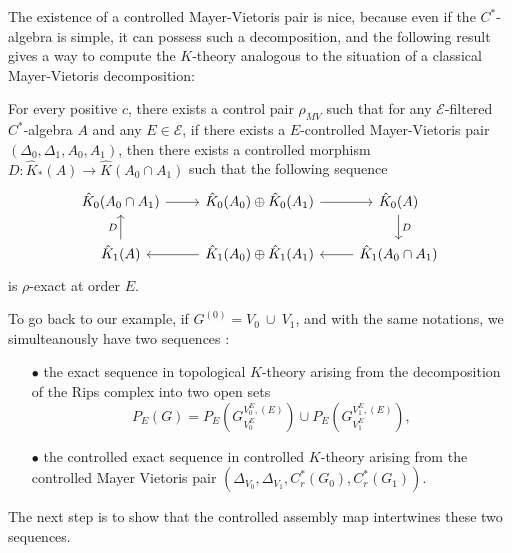 


The existence of a controlled Mayer-Vietoris pair is nice, because even if the $C^*$-algebra is simple, it can possess such a decomposition, and the following result gives a way to compute the $K$-theory analogous to the situation of a classical Mayer-Vietoris decomposition:

\begin{thm}
For every positive $c$, there exists a control pair $\rho_{MV}$ such that for any $\mathcal E$-filtered $C^*$-algebra $A$ and any $E\in\mathcal E$, if there exists a $E$-controlled Mayer-Vietoris pair $(\Delta_0,\Delta_1,A_0,A_1)$, then there exists a controlled morphism $D : \hat K_*(A)\rightarrow \hat K(A_0\cap A_1)$ such that the following sequence 
\[\begin{tikzcd}
\hat K_0(A_0\cap A_1 ) \arrow{r}& \hat K_0(A_0)\arrow{r}\oplus \hat K_0(A_1) & \hat K_0(A)\arrow{d}{D} \\
\arrow{u}{D}\hat K_1(A) &\arrow{l} \hat K_1(A_0)\oplus \hat K_1(A_1) & \arrow{l}\hat K_1(A_0\cap A_1) 
\end{tikzcd}\]
is $\rho$-exact at order $E$.
\end{thm}

To go back to our example, if $G^{(0)} = V_0\ \cup \ V_1 $, and with the same notations, we simulteanously have two sequences : \\
\begin{itemize}
\item[$\bullet$] the exact sequence in topological $K$-theory arising from the decomposition of the Rips complex into two open sets 
\[P_E(G) = P_E(G^{V_0^E,(E)}_{V_0^E}) \cup P_E(G^{V_1^E,(E)}_{V_1^E}) ,\] 
\item[$\bullet$] the controlled exact sequence in controlled $K$-theory arising from the controlled Mayer Vietoris pair $(\Delta_{V_0},\Delta_{V_1}, C_r^*(G_0),C_r^*(G_1))$. \\
\end{itemize}
The next step is to show that the controlled assembly map intertwines these two sequences. \\

